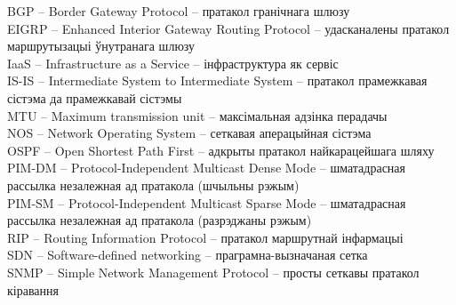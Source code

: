 \thispagestyle{empty}

\noindent
BGP -- Border Gateway Protocol -- пратакол гранічнага шлюзу \\
EIGRP -- Enhanced Interior Gateway Routing Protocol -- удасканалены пратакол маршрутызацыі ўнутранага шлюзу\\
IaaS -- Infrastructure as a Service -- інфраструктура як сервіс \\
IS-IS -- Intermediate System to Intermediate System  -- пратакол прамежкавая сістэма да прамежкавай сістэмы \\
MTU -- Maximum transmission unit -- максімальная адзінка перадачы \\
NOS -- Network Operating System -- сеткавая аперацыйная сістэма \\
OSPF -- Open Shortest Path First -- адкрыты пратакол найкарацейшага шляху \\
PIM-DM -- Protocol-Independent Multicast Dense Mode -- шматадрасная рассылка незалежная ад пратакола (шчыльны рэжым) \\
PIM-SM -- Protocol-Independent Multicast Sparse Mode -- шматадрасная рассылка незалежная ад пратакола (разрэджаны рэжым) \\
RIP -- Routing Information Protocol -- пратакол маршрутнай інфармацыі \\
SDN -- Software-defined networking -- праграмна-вызначаная сетка \\
SNMP -- Simple Network Management Protocol -- просты сеткавы пратакол кіравання
